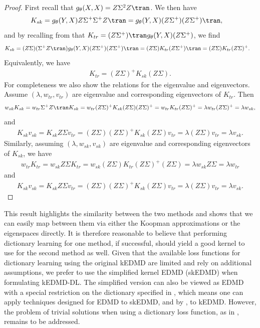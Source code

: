 \documentclass{article}
\begin{document}
\begin{proof}
   First recall that \(g_{\theta}(X,X) = Z\Sigma^2 Z\tran\). We then have
   \begin{align*}
        K_{sk} &= g_{\theta}(Y,X) Z \Sigma^+ \Sigma^+ Z\tran = g_{\theta}(Y,X) (Z\Sigma^+) (Z \Sigma^+)\tran,
   \end{align*} 
   and by recalling from  that \(K_{tr} = (Z\Sigma^+)\tran g_{\theta}(Y,X) (Z\Sigma^+)\), we find
   \begin{align*}
        K_{sk} &=  (Z \Sigma) (\Sigma^+Z\tran) g_{\theta}(Y,X) (Z\Sigma^+) (Z \Sigma^+)\tran = (Z\Sigma) K_{tr} (Z\Sigma^+)\tran = (Z \Sigma)K_{tr} (Z\Sigma)^+.
   \end{align*}
   Equivalently, we have
   \begin{align*}
        K_{tr} = (Z\Sigma)^+ K_{sk} (Z\Sigma).
   \end{align*}
   For completeness we also show the relations for the eigenvalue and eigenvectors. Assume \((\lambda, w_{tr}, v_{tr})\) are eigenvalue and corresponding eigenvectors of \(K_{tr}\). Then 
   \begin{align*}
        w_{sk}K_{sk} = w_{tr} \Sigma^+ Z\tran K_{sk} = w_{tr} (Z\Sigma)^+ K_{sk} (Z\Sigma) (Z\Sigma)^+ = w_{tr} K_{tr} (Z\Sigma)^+ = \lambda w_{tr}(Z\Sigma)^+ = \lambda w_{sk},
   \end{align*}
   and
   \begin{align*}
        K_{sk} v_{sk} = K_{sk} Z\Sigma v_{tr} = (Z\Sigma) (Z\Sigma)^+ K_{sk} (Z\Sigma) v_{tr} = \lambda (Z\Sigma) v_{tr} = \lambda v_{sk}.
   \end{align*}
   Similarly, assuming \((\lambda, w_{sk}, v_{sk})\) are eigenvalue and corresponding eigenvectors of \(K_{sk}\), we have
   \begin{align*}
        w_{tr}K_{tr} = w_{sk} Z\Sigma K_{tr} = w_{sk} (Z\Sigma) K_{tr} (Z\Sigma)^+ (Z\Sigma) = \lambda w_{sk} Z\Sigma = \lambda w_{tr}
   \end{align*}
   and
   \begin{align*}
        K_{sk} v_{sk} = K_{sk} Z\Sigma v_{tr} = (Z\Sigma) (Z\Sigma)^+ K_{sk} (Z\Sigma) v_{tr} = \lambda (Z\Sigma) v_{tr} = \lambda v_{sk}.
   \end{align*}
\end{proof}

This result highlights the similarity between the two methods and shows that we can easily map between them via either the Koopman approximations or the eigenspaces directly. It is therefore reasonable to believe that performing dictionary learning for one method, if successful, should yield a good kernel to use for the second method as well. Given that the available loss functions for dictionary learning using the original kEDMD are limited and rely on additional assumptions, we prefer to use the simplified kernel EDMD (skEDMD) when formulating kEDMD-DL. The simplified version can also be viewed as EDMD with a special restriction on the dictionary specified in , which means one can apply techniques designed for EDMD to skEDMD, and by , to kEDMD. However, the problem of trivial solutions when using a dictionary loss function, as in , remains to be addressed.
\end{document}
